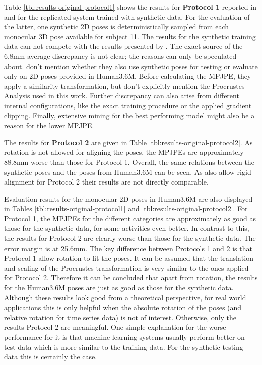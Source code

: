 



Table \ref{tbl:results-original-protocol1} shows the results for \textbf{Protocol 1} reported in \cite{drover18} and for the replicated system trained with synthetic data.
For the evaluation of the latter, one synthetic 2D poses is deterministically sampled from each monocular 3D pose available for subject 11.
The results for the synthetic training data can not compete with the results presented by \citet{drover18}.
The exact source of the 6.8mm average discrepancy is not clear; the reasons can only be speculated about.
\citet{drover18} don't mention whether they also use synthetic poses for testing or evaluate only on 2D poses provided in Human3.6M.
Before calculating the MPJPE, they apply a similarity transformation, but don't explicitly mention the Procrustes Analysis used in this work.
Further discrepancy can also arise from different internal configurations, like the exact training procedure or the applied gradient clipping.
Finally, extensive mining for the best performing model might also be a reason for the lower MPJPE.

The results for \textbf{Protocol 2} are given in Table \ref{tbl:results-original-protocol2}.
As rotation is not allowed for aligning the poses, the MPJPEs are approximately 88.8mm worse than those for Protocol 1.
Overall, the same relations between the synthetic poses and the poses from Human3.6M can be seen.
As \citet{drover18} also allow rigid alignment for Protocol 2 their results are not directly comparable.

Evaluation results for the monocular 2D poses in Human3.6M are also displayed in Tables \ref{tbl:results-original-protocol1} and \ref{tbl:results-original-protocol2}.
For Protocol 1, the MPJPEs for the different categories are approximately as good as those for the synthetic data, for some activities even better.
In contrast to this, the results for Protocol 2 are clearly worse than those for the synthetic data.
The error margin is at 25.6mm.
The key difference between Protocols 1 and 2 is that Protocol 1 allow rotation to fit the poses.
It can be assumed that the translation and scaling of the Procrustes transformation is very similar to the ones applied for Protocol 2.
Therefore it can be concluded that apart from rotation, the results for the Human3.6M poses are just as good as those for the synthetic data.
Although these results look good from a theoretical perspective, for real world applications this is only helpful when the absolute rotation of the poses (and relative rotation for time series data) is not of interest.
Otherwise, only the results Protocol 2 are meaningful.
One simple explanation for the worse performance for it is that machine learning systems usually perform better on test data which is more similar to the training data.
For the synthetic testing data this is certainly the case.

